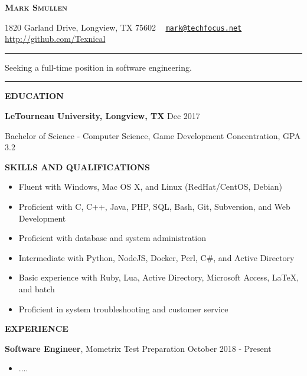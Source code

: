 \documentclass[letterpaper]{article}
\newcommand{\titlename}[1]{\centerline{\huge \bfseries{\scshape{#1}}}}
\newcommand{\contactinfo}[1]{\centerline{\small #1}}
\renewcommand{\section}[1]{\bigskip\noindent\textbf{#1}\smallskip}
\newcommand{\entry}[3]{\textbf{#1}, #2\begin{itemize}[leftmargin=3.5em]#3\end{itemize}\bigskip}
\begin{document}
\titlename{Mark Smullen}
\contactinfo{%
    1820 Garland Drive, Longview, TX 75602 \textperiodcentered \ %
    \href{mailto:mark@techfocus.net}{\nolinkurl{mark@techfocus.net}} \textperiodcentered \ %
    \url{http://github.com/Texnical} \textperiodcentered \ %
    \phonenumber[country=US]{2707911770}%
}
\vspace{2mm}
\hrule
\vspace{2mm}
\centerline{Seeking a full-time position in software engineering.}
\vspace{2mm}
\hrule

\section{EDUCATION}

\textbf{LeTourneau University, Longview, TX}                            \hfill          Dec 2017

Bachelor of Science - Computer Science, Game Development Concentration, GPA 3.2


\section{SKILLS AND QUALIFICATIONS}

\begin{multicols}{2}
\begin{itemize}[leftmargin=3.5em]
    \item Fluent with Windows, Mac OS X, and Linux (RedHat/CentOS, Debian)
    \item Proficient with C, C++, Java, PHP, SQL, Bash, Git, Subversion, and Web Development
    \item Proficient with database and system administration
    \item Intermediate with Python, NodeJS, Docker, Perl, C\#, and Active Directory
    \item Basic experience with Ruby, Lua, Active Directory, Microsoft Access, \LaTeX{}, and batch
    \item Proficient in system troubleshooting and customer service
\end{itemize}
\end{multicols}

\section{EXPERIENCE}

\entry{Software Engineer}{Mometrix Test Preparation                 \hfill                  October 2018 - Present} {
    \item ....
}
\end{document}

